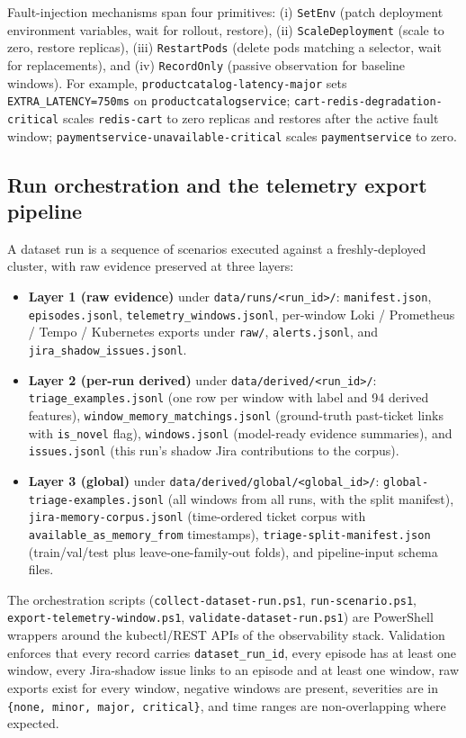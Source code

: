 Fault-injection mechanisms span four primitives: (i) \texttt{SetEnv} (patch deployment environment variables, wait for rollout, restore), (ii) \texttt{ScaleDeployment} (scale to zero, restore replicas), (iii) \texttt{RestartPods} (delete pods matching a selector, wait for replacements), and (iv) \texttt{RecordOnly} (passive observation for baseline windows). For example, \texttt{productcatalog-latency-major} sets \texttt{EXTRA\_LATENCY=750ms} on \texttt{productcatalogservice}; \texttt{cart-redis-degradation-critical} scales \texttt{redis-cart} to zero replicas and restores after the active fault window; \texttt{paymentservice-unavailable-critical} scales \texttt{paymentservice} to zero.

\subsection{Run orchestration and the telemetry export pipeline}

A dataset run is a sequence of scenarios executed against a freshly-deployed cluster, with raw evidence preserved at three layers:

\begin{itemize}
\item \textbf{Layer 1 (raw evidence)} under \texttt{data/runs/<run\_id>/}: \texttt{manifest.json}, \texttt{episodes.jsonl}, \texttt{telemetry\_windows.jsonl}, per-window Loki / Prometheus / Tempo / Kubernetes exports under \texttt{raw/}, \texttt{alerts.jsonl}, and \texttt{jira\_shadow\_issues.jsonl}.
\item \textbf{Layer 2 (per-run derived)} under \texttt{data/derived/<run\_id>/}: \texttt{triage\_examples.jsonl} (one row per window with label and 94 derived features), \texttt{window\_memory\_matchings.jsonl} (ground-truth past-ticket links with \texttt{is\_novel} flag), \texttt{windows.jsonl} (model-ready evidence summaries), and \texttt{issues.jsonl} (this run's shadow Jira contributions to the corpus).
\item \textbf{Layer 3 (global)} under \texttt{data/derived/global/<global\_id>/}: \texttt{global-triage-examples.jsonl} (all windows from all runs, with the split manifest), \texttt{jira-memory-corpus.jsonl} (time-ordered ticket corpus with \texttt{available\_as\_memory\_from} timestamps), \texttt{triage-split-manifest.json} (train/val/test plus leave-one-family-out folds), and pipeline-input schema files.
\end{itemize}

The orchestration scripts (\texttt{collect-dataset-run.ps1}, \texttt{run-scenario.ps1}, \texttt{export-telemetry-window.ps1}, \texttt{validate-dataset-run.ps1}) are PowerShell wrappers around the kubectl/REST APIs of the observability stack. Validation enforces that every record carries \texttt{dataset\_run\_id}, every episode has at least one window, every Jira-shadow issue links to an episode and at least one window, raw exports exist for every window, negative windows are present, severities are in \texttt{\{none, minor, major, critical\}}, and time ranges are non-overlapping where expected.

